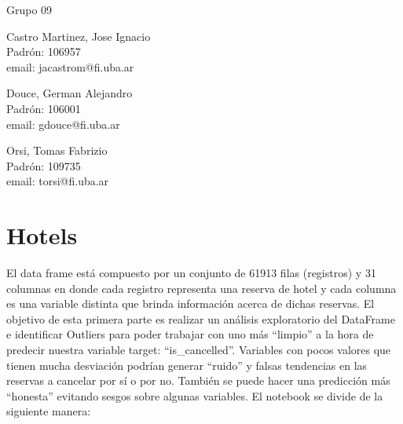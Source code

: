 \documentclass{article}
\begin{document}
\begin{titlepage}
  \vspace{0.4cm}
  \begin{center}
    {\Large{Grupo 09}}\\
    \vspace{0.6cm}
    {\begin{minipage}[t]{.32\textwidth}
        \begin{center}
	Castro  Martinez, Jose Ignacio\\
          {\small{Padrón: 106957}}\\
          {\small{email: jacastrom@fi.uba.ar}}
        \end{center}
	\end{minipage}
	\begin{minipage}[t]{.32\textwidth}
        \begin{center}
	Douce, German Alejandro\\
          {\small{Padrón: 106001}}\\
          {\small{email: gdouce@fi.uba.ar}}\\
        \end{center}
      \end{minipage}
      \begin{minipage}[t]{.32\textwidth}
        \begin{center}
          Orsi, Tomas Fabrizio\\
          {\small{Padrón: 109735}}\\
          {\small{email: torsi@fi.uba.ar}}
        \end{center}
      \end{minipage}}
  \end{center}
\end{titlepage}







\section*{Hotels}
El data frame está compuesto por un conjunto de 61913 filas (registros) y 31 columnas en donde cada registro representa una reserva de hotel y cada columna es una variable distinta que brinda información acerca de dichas reservas. El objetivo de esta primera parte es realizar un análisis exploratorio del DataFrame e identificar Outliers para poder trabajar con uno más “limpio” a la hora de predecir nuestra variable target: “is\_cancelled”. Variables con pocos valores que tienen mucha desviación podrían generar “ruido” y falsas tendencias en las reservas a cancelar por sí o por no. También se puede hacer una predicción más “honesta” evitando sesgos sobre algunas variables.
El notebook se divide de la siguiente manera:
\end{document}
